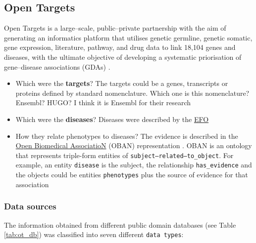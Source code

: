 \subsection{Open Targets}
\label{subsec:ot}

Open Targets is a large--scale, public--private partnership with the aim of generating an informatics platform that utilises genetic germline, genetic somatic, gene expression, literature, pathway, and drug data to link 18,104 genes and diseases, with the ultimate objective of developing a systematic priorisation of gene--disease associations (GDAs) \cite{ferrero2017}.
\begin{itemize}
    \item Which were the \textbf{targets}? The targets could be a genes, transcripts or proteins defined by standard nomenclature. Which one is this nomenclature? Ensembl? HUGO? I think it is Ensembl for their research
    
    \item Which were the \textbf{diseases}? Diseases were described by the \href{https://goo.gl/YvvC8D}{EFO} \cite{experimentalFactorOntology2010}
    
    \item How they relate phenotypes to diseases? The evidence is described in the \href{https://goo.gl/CNqAqt}{Open Biomedical AssociatioN} (OBAN) representation \cite{sarntivijai2016}. OBAN is an ontology that represents triple-form entities of \texttt{subject--related--to\_object}. For example, an entity \texttt{disease} is the subject, the relationship \texttt{has\_evidence} and the objects could be entities \texttt{phenotypes} plus the source of evidence for that association
    
\end{itemize}

\subsubsection{Data sources}
\label{subsubsec:ot_ds}

The information obtained from different public domain databases (see Table \ref{tab:ot_db}) was classified into seven different \texttt{data types}:

